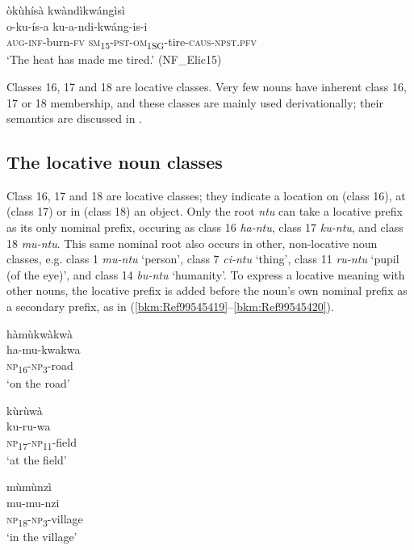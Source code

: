 \ea
\label{bkm:Ref99545334}
òkùhísà kwàndìkwángìsì\\
\gll o-ku-ís-a    ku-a-ndi-kwáng-is-i\\
\textsc{aug}-\textsc{inf}-burn-\textsc{fv}  \textsc{sm}\textsubscript{15}-\textsc{pst}-\textsc{om}\textsubscript{1SG}-tire-\textsc{caus}-\textsc{npst}.\textsc{pfv}\\
\glt ‘The heat has made me tired.’ (NF\_Elic15)
\z

Classes 16, 17 and 18 are locative classes. Very few nouns have inherent class 16, 17 or 18 membership, and these classes are mainly used derivationally; their semantics are discussed in .

\subsection{The locative noun classes}
\label{bkm:Ref452049189}\hypertarget{Toc75352640}{}
Class 16, 17 and 18 are locative classes; they indicate a location on (class 16), at (class 17) or in (class 18) an object. Only the root \textit{ntu} can take a locative prefix as its only nominal prefix, occuring as class 16 \textit{ha-ntu}, class 17 \textit{ku-ntu}, and class 18 \textit{mu-ntu}. This same nominal root also occurs in other, non-locative noun classes, e.g. class 1 \textit{mu-ntu} ‘person’, class 7 \textit{ci-ntu} ‘thing’, class 11 \textit{ru-ntu} ‘pupil (of the eye)’, and class 14 \textit{bu-ntu} ‘humanity’. To express a locative meaning with other nouns, the locative prefix is added before the noun’s own nominal prefix as a secondary prefix, as in (\ref{bkm:Ref99545419}--\ref{bkm:Ref99545420}).

\ea
\label{bkm:Ref99545419}
\glll hàmùkwàkwà\\
ha-mu-kwakwa\\
\textsc{np}\textsubscript{16}-\textsc{np}\textsubscript{3}-road\\
\glt ‘on the road’
\z

\ea
\glll kùrùwà\\
ku-ru-wa\\
\textsc{np}\textsubscript{17}-\textsc{np}\textsubscript{11}-field\\
\glt ‘at the field’
\z

\ea
\label{bkm:Ref99545420}
\glll mùmùnzì\\
mu-mu-nzi\\
\textsc{np}\textsubscript{18}-\textsc{np}\textsubscript{3}-village\\
\glt ‘in the village’
\z

